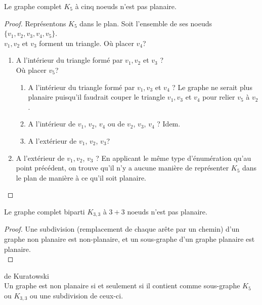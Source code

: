 \begin{mytheo}
Le graphe complet $K_5$ à cinq noeuds n'est pas planaire.

\begin{proof}

Représentons $K_5$ dans le plan. Soit l'ensemble de ses noeuds $\{v_1, v_2, v_3, v_4, v_5\}$.\\
$v_1, v_2$ et $v_3$ forment un triangle. Où placer $v_4$?



\begin{enumerate}
\item A l'intérieur du triangle formé par $v_1, v_2$ et $v_3$ ?\\
Où placer $v_5$?
\begin{enumerate}
\item A l'intérieur du triangle formé par $v_1, v_3$ et $v_4$ ? Le graphe ne serait plus planaire puisqu'il faudrait couper le triangle $v_1, v_3$ et $v_4$ pour relier $v_5$ à $v_2$.\\
\item A l'intérieur de $v_1$, $v_2$, $v_4$ ou de $v_2$, $v_3$, $v_4$ ? Idem.
\item A l'extérieur de $v_1$, $v_2$, $v_3$? \\
\end{enumerate}
\item A l'extérieur de $v_1, v_2$, $v_3$ ? En applicant le même type d'énumération qu'au point précédent, on trouve qu'il n'y a aucune manière de représenter $K_5$ dans le plan de manière à ce qu'il soit planaire.
\end{enumerate}
\end{proof}
\end{mytheo}
\begin{mytheo}
Le graphe complet biparti $K_{3,3}$ à $3+3$ noeuds n'est pas planaire.
\begin{proof}
Une subdivision (remplacement de chaque arête par un chemin) d'un graphe non planaire est non-planaire, et un sous-graphe d'un graphe planaire est planaire.\\
\end{proof}
\end{mytheo}
\begin{mytheo} de Kuratowski\\
Un graphe est non planaire si et seulement si il contient comme sous-graphe $K_5$ ou $K_{3,3}$ ou une subdivision de ceux-ci.
\end{mytheo}

